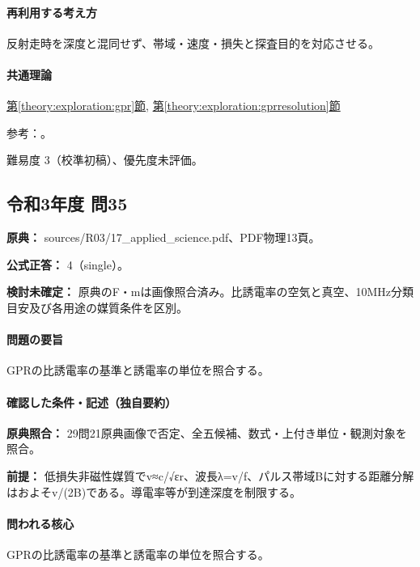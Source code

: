 \paragraph{再利用する考え方} 反射走時を深度と混同せず、帯域・速度・損失と探査目的を対応させる。

\paragraph{共通理論} \hyperref[theory:exploration:gpr]{第\ref*{theory:exploration:gpr}節}, \hyperref[theory:exploration:gprresolution]{第\ref*{theory:exploration:gprresolution}節}

\par 参考：\cite{epa_gpr}。

\par 難易度 3（校準初稿）、優先度未評価。

\subsection{令和3年度 問35}
\label{q:r03-reg-applied-35}

\noindent\textbf{原典：} sources/R03/17\_applied\_science.pdf、PDF物理13頁。

\textbf{公式正答：} 4（single）。

\par\textbf{検討未確定：} 原典のF・mは画像照合済み。比誘電率の空気と真空、10MHz分類目安及び各用途の媒質条件を区別。

\paragraph{問題の要旨} GPRの比誘電率の基準と誘電率の単位を照合する。

\paragraph{確認した条件・記述（独自要約）}\mbox{}\par

\noindent\textbf{原典照合：} 29問21原典画像で否定、全五候補、数式・上付き単位・観測対象を照合。\par

\noindent\textbf{前提：} 低損失非磁性媒質でv≈c/√εr、波長λ=v/f、パルス帯域Bに対する距離分解はおよそv/(2B)である。導電率等が到達深度を制限する。\par

\paragraph{問われる核心} GPRの比誘電率の基準と誘電率の単位を照合する。

